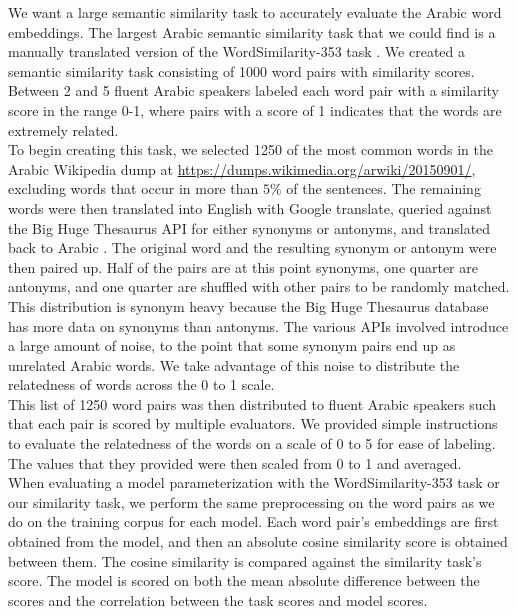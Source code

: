 We want a large semantic similarity task to accurately evaluate the Arabic word embeddings. The largest Arabic semantic similarity task that we could find is a manually translated version of the WordSimilarity-353 task \cite{finkelstein:2001,hassan:2009}. We created a semantic similarity task consisting of 1000 word pairs with similarity scores. Between 2 and 5 fluent Arabic speakers labeled each word pair with a similarity score in the range 0-1, where pairs with a score of 1 indicates that the words are extremely related.
\\
To begin creating this task, we selected 1250 of the most common words in the Arabic Wikipedia dump \cite{wiki:xxx} at \url{https://dumps.wikimedia.org/arwiki/20150901/}, excluding words that occur in more than $5\%$ of the sentences. The remaining words were then translated into English with Google translate, queried against the Big Huge Thesaurus API for either synonyms or antonyms, and translated back to Arabic \cite{google:online,bhl:online}. The original word and the resulting synonym or antonym were then paired up. Half of the pairs are at this point synonyms, one quarter are antonyms, and one quarter are shuffled with other pairs to be randomly matched. This distribution is synonym heavy because the Big Huge Thesaurus database has more data on synonyms than antonyms. The various APIs involved introduce a large amount of noise, to the point that some synonym pairs end up as unrelated Arabic words. We take advantage of this noise to distribute the relatedness of words across the 0 to 1 scale.
\\
This list of 1250 word pairs was then distributed to fluent Arabic speakers such that each pair is scored by multiple evaluators. We provided simple instructions to evaluate the relatedness of the words on a scale of 0 to 5 for ease of labeling. The values that they provided were then scaled from 0 to 1 and averaged. 
\\
When evaluating a model parameterization with the WordSimilarity-353 task or our similarity task, we perform the same preprocessing on the word pairs as we do on the training corpus for each model. Each word pair's embeddings are first obtained from the model, and then an absolute cosine similarity score is obtained between them. The cosine similarity is compared against the similarity task's score. The model is scored on both the mean absolute difference between the scores and the correlation between the task scores and model scores.




